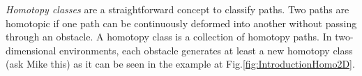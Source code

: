 \documentclass[graybox]{svmult}
\begin{document}
\emph{Homotopy classes} are a straightforward concept to classify paths. Two paths are homotopic if one path can be continuously  deformed into another without passing through an obstacle. A homotopy class is a collection of homotopy paths. In two-dimensional environments, each obstacle generates at least a new homotopy class (ask Mike this) as it can be seen in the example at Fig.\ref{fig:IntroductionHomo2D}. 

\begin{figure}[]
		\centering
\end{figure}
\end{document}
